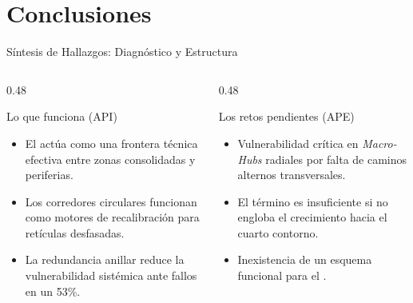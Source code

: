 
\section{Conclusiones}

\begin{frame}{Síntesis de Hallazgos: Diagnóstico y Estructura}
  \begin{columns}[T]
    \begin{column}{0.48\textwidth}
      \begin{block}{Lo que funciona (API)}
        \begin{itemize}
          \item El  actúa como una frontera técnica efectiva 
                entre zonas consolidadas y periferias.
          \item Los corredores circulares funcionan como motores de recalibración para  
                retículas desfasadas.
          \item La redundancia anillar reduce la vulnerabilidad sistémica ante fallos en un 53\%.
        \end{itemize}
      \end{block}
    \end{column}
    \begin{column}{0.48\textwidth}
      \begin{alertblock}{Los retos pendientes (APE)}
        \begin{itemize}
          \item Vulnerabilidad crítica en \textit{Macro-Hubs} radiales por falta de caminos alternos transversales.
          \item El término  es insuficiente si no engloba el crecimiento hacia el cuarto contorno.
          \item Inexistencia de un esquema funcional para el .
        \end{itemize}
      \end{alertblock}
    \end{column}
  \end{columns}
\end{frame}

